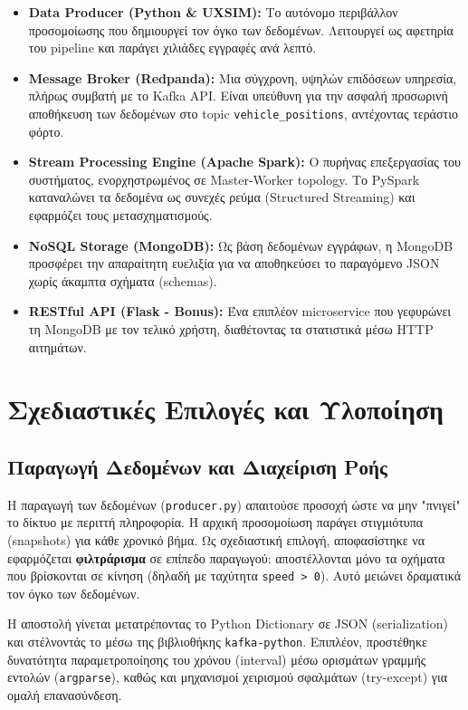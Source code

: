 \documentclass[11pt,a4paper]{article}
\begin{document}
\begin{itemize}
    \item \textbf{Data Producer (Python \& UXSIM):} Το αυτόνομο περιβάλλον προσομοίωσης που δημιουργεί τον όγκο των δεδομένων. Λειτουργεί ως αφετηρία του pipeline και παράγει χιλιάδες εγγραφές ανά λεπτό.
    \item \textbf{Message Broker (Redpanda):} Μια σύγχρονη, υψηλών επιδόσεων υπηρεσία, πλήρως συμβατή με το Kafka API. Είναι υπεύθυνη για την ασφαλή προσωρινή αποθήκευση των δεδομένων στο topic \texttt{vehicle\_positions}, αντέχοντας τεράστιο φόρτο.
    \item \textbf{Stream Processing Engine (Apache Spark):} Ο πυρήνας επεξεργασίας του συστήματος, ενορχηστρωμένος σε Master-Worker topology. Το PySpark καταναλώνει τα δεδομένα ως συνεχές ρεύμα (Structured Streaming) και εφαρμόζει τους μετασχηματισμούς.
    \item \textbf{NoSQL Storage (MongoDB):} Ως βάση δεδομένων εγγράφων, η MongoDB προσφέρει την απαραίτητη ευελιξία για να αποθηκεύσει το παραγόμενο JSON χωρίς άκαμπτα σχήματα (schemas).
    \item \textbf{RESTful API (Flask - Bonus):} Ένα επιπλέον microservice που γεφυρώνει τη MongoDB με τον τελικό χρήστη, διαθέτοντας τα στατιστικά μέσω HTTP αιτημάτων.
\end{itemize}

\section{Σχεδιαστικές Επιλογές και Υλοποίηση}

\subsection{Παραγωγή Δεδομένων και Διαχείριση Ροής}
Η παραγωγή των δεδομένων (\texttt{producer.py}) απαιτούσε προσοχή ώστε να μην "πνιγεί" το δίκτυο με περιττή πληροφορία. Η αρχική προσομοίωση παράγει στιγμιότυπα (snapshots) για κάθε χρονικό βήμα. Ως σχεδιαστική επιλογή, αποφασίστηκε να εφαρμόζεται \textbf{φιλτράρισμα} σε επίπεδο παραγωγού: αποστέλλονται μόνο τα οχήματα που βρίσκονται σε κίνηση (δηλαδή με ταχύτητα \texttt{speed > 0}). Αυτό μειώνει δραματικά τον όγκο των δεδομένων. 

Η αποστολή γίνεται μετατρέποντας το Python Dictionary σε JSON (serialization) και στέλνοντάς το μέσω της βιβλιοθήκης \texttt{kafka-python}. Επιπλέον, προστέθηκε δυνατότητα παραμετροποίησης του χρόνου (interval) μέσω ορισμάτων γραμμής εντολών (\texttt{argparse}), καθώς και μηχανισμοί χειρισμού σφαλμάτων (try-except) για ομαλή επανασύνδεση.
\end{document}
